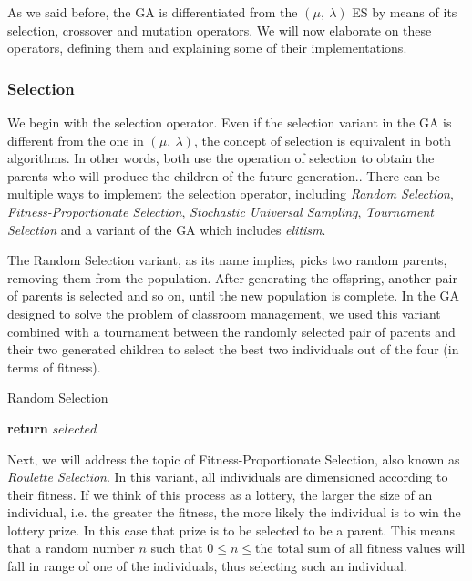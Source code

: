 As we said before, the GA is differentiated from the $(\mu,\ \lambda)$ ES by means of its selection, crossover and mutation operators. We will now elaborate on these operators, defining them and explaining some of their implementations.

\subsubsection{Selection}

We begin with the selection operator. Even if the selection variant in the GA is different from the one in $(\mu,\ \lambda)$, the concept of selection is equivalent in both algorithms. In other words, both use the operation of selection to obtain the parents who will produce the children of the future generation.. There can be multiple ways to implement the selection operator, including \textit{Random Selection}, \textit{Fitness-Proportionate Selection}, \textit{Stochastic Universal Sampling}, \textit{Tournament Selection} and a variant of the GA which includes \textit{elitism}.

The Random Selection variant, as its name implies, picks two random parents, removing them from the population. After generating the offspring, another pair of parents is selected and so on, until the new population is complete. In the GA designed to solve the problem of classroom management, we used this variant combined with a tournament between the randomly selected pair of parents and their two generated children to select the best two individuals out of the four (in terms of fitness).

\begin{algorithm}[H]
    \caption{Random Selection}
    \label{theory-ga-ransel}
    \begin{algorithmic}[1]
             
            \State \textbf{return} $selected$
        \EndProcedure
    \end{algorithmic}
\end{algorithm}

Next, we will address the topic of Fitness-Proportionate Selection, also known as \textit{Roulette Selection}. In this variant, all individuals are dimensioned according to their fitness. If we think of this process as a lottery, the larger the size of an individual, i.e. the greater the fitness, the more likely the individual is to win the lottery prize. In this case that prize is to be selected to be a parent. This means that a random number $n$ such that $0 \leq n \leq \text{the total sum of all fitness values}$ will fall in range of one of the individuals, thus selecting such an individual.

